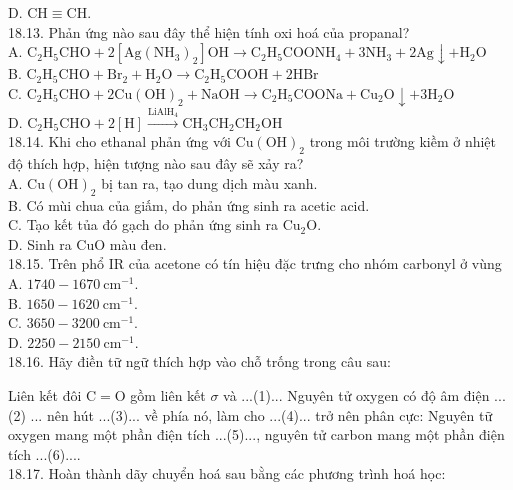 \documentclass[10pt]{article}
\begin{document}
\begin{enumerate}
D. $\mathrm{CH} \equiv \mathrm{CH}$.\\
18.13. Phản ứng nào sau đây thể hiện tính oxi hoá của propanal?\\
A. $\mathrm{C}_{2} \mathrm{H}_{5} \mathrm{CHO}+2\left[\mathrm{Ag}\left(\mathrm{NH}_{3}\right)_{2}\right] \mathrm{OH} \longrightarrow \mathrm{C}_{2} \mathrm{H}_{5} \mathrm{COONH}_{4}+3 \mathrm{NH}_{3}+2 \mathrm{Ag} \downarrow+\mathrm{H}_{2} \mathrm{O}$\\
B. $\mathrm{C}_{2} \mathrm{H}_{5} \mathrm{CHO}+\mathrm{Br}_{2}+\mathrm{H}_{2} \mathrm{O} \rightarrow \mathrm{C}_{2} \mathrm{H}_{5} \mathrm{COOH}+2 \mathrm{HBr}$\\
C. $\mathrm{C}_{2} \mathrm{H}_{5} \mathrm{CHO}+2 \mathrm{Cu}(\mathrm{OH})_{2}+\mathrm{NaOH} \rightarrow \mathrm{C}_{2} \mathrm{H}_{5} \mathrm{COONa}+\mathrm{Cu}_{2} \mathrm{O} \downarrow+3 \mathrm{H}_{2} \mathrm{O}$\\
D. $\mathrm{C}_{2} \mathrm{H}_{5} \mathrm{CHO}+2[\mathrm{H}] \xrightarrow{\mathrm{LiAlH}_{4}} \mathrm{CH}_{3} \mathrm{CH}_{2} \mathrm{CH}_{2} \mathrm{OH}$\\
18.14. Khi cho ethanal phản ứng với $\mathrm{Cu}(\mathrm{OH})_{2}$ trong môi trường kiềm ở nhiệt độ thích hợp, hiện tượng nào sau đây sẽ xảy ra?\\
A. $\mathrm{Cu}(\mathrm{OH})_{2}$ bị tan ra, tạo dung dịch màu xanh.\\
B. Có mùi chua của giấm, do phản ứng sinh ra acetic acid.\\
C. Tạo kết tủa đó gạch do phản ứng sinh ra $\mathrm{Cu}_{2} \mathrm{O}$.\\
D. Sinh ra CuO màu đen.\\
18.15. Trên phổ IR của acetone có tín hiệu đặc trưng cho nhóm carbonyl ở vùng\\
A. $1740-1670 \mathrm{~cm}^{-1}$.\\
B. $1650-1620 \mathrm{~cm}^{-1}$.\\
C. $3650-3200 \mathrm{~cm}^{-1}$.\\
D. $2250-2150 \mathrm{~cm}^{-1}$.\\
18.16. Hãy điền tữ ngữ thích hợp vào chỗ trống trong câu sau:
\end{enumerate}

Liên kết đôi $\mathrm{C}=\mathrm{O}$ gồm liên kết $\sigma$ và ...(1)... Nguyên tử oxygen có độ âm điện ...(2) ... nên hút ...(3)... về phía nó, làm cho ...(4)... trở nên phân cực: Nguyên tữ oxygen mang một phần điện tích ...(5)..., nguyên tử carbon mang một phần điện tích ...(6)....\\
18.17. Hoàn thành dãy chuyển hoá sau bằng các phương trình hoá học:
\end{document}
